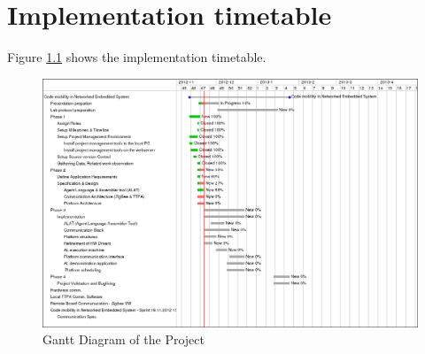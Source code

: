 \documentclass{scrreprt}
\begin{document}
\chapter{Implementation timetable}

Figure \ref{fig:ganttdiag} shows the implementation timetable.

\begin{figure}[!htbp]
\centering
\includegraphics[scale=0.4]{figures/gantt.png}
\caption{Gantt Diagram of the Project}
\label{fig:ganttdiag}
\end{figure}
\end{document}
